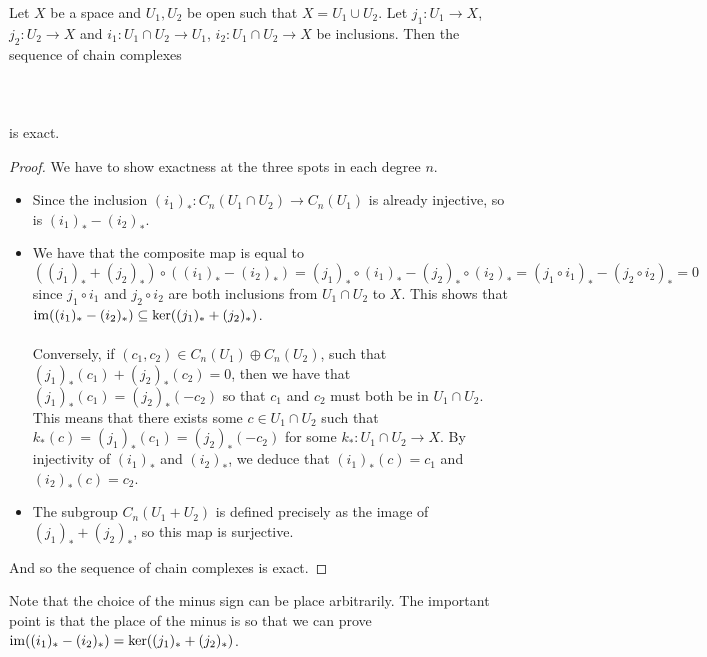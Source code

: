 \documentclass[a4paper]{article}
\begin{document}
\begin{prp}{}{} Let $X$ be a space and $U_1,U_2$ be open such that $X=U_1\cup U_2$. Let $j_1:U_1\to X$, $j_2:U_2\to X$ and $i_1:U_1\cap U_2\to U_1$, $i_2:U_1\cap U_2\to X$ be inclusions. Then the sequence of chain complexes \\~\\
\\~\\
is exact. \tcbline
\begin{proof}
We have to show exactness at the three spots in each degree $n$. 
\begin{itemize}
\item Since the inclusion $(i_1)_\ast:C_n(U_1\cap U_2)\to C_n(U_1)$ is already injective, so is $(i_1)_\ast-(i_2)_\ast$. 
\item We have that the composite map is equal to $$((j_1)_\ast+(j_2)_\ast)\circ((i_1)_\ast-(i_2)_\ast)=(j_1)_\ast\circ(i_1)_\ast-(j_2)_\ast\circ(i_2)_\ast=(j_1\circ i_1)_\ast-(j_2\circ i_2)_\ast=0$$ since $j_1\circ i_1$ and $j_2\circ i_2$ are both inclusions from $U_1\cap U_2$ to $X$. This shows that $\operatorname{im}((i_1)_\ast-(i_2)_\ast)\subseteq\ker((j_1)_\ast+(j_2)_\ast)$. \\~\\

Conversely, if $(c_1,c_2)\in C_n(U_1)\oplus C_n(U_2)$, such that $(j_1)_\ast(c_1)+(j_2)_\ast(c_2)=0$, then we have that $(j_1)_\ast(c_1)=(j_2)_\ast(-c_2)$ so that $c_1$ and $c_2$ must both be in $U_1\cap U_2$. This means that there exists some $c\in U_1\cap U_2$ such that $k_\ast(c)=(j_1)_\ast(c_1)=(j_2)_\ast(-c_2)$ for some $k_\ast:U_1\cap U_2\to X$. By injectivity of $(i_1)_\ast$ and $(i_2)_\ast$, we deduce that $(i_1)_\ast(c)=c_1$ and $(i_2)_\ast(c)=c_2$. 
\item The subgroup $C_n(U_1+U_2)$ is defined precisely as the image of $(j_1)_\ast+(j_2)_\ast$, so this map is surjective. 
\end{itemize}
And so the sequence of chain complexes is exact. 
\end{proof}
\end{prp}

Note that the choice of the minus sign can be place arbitrarily. The important point is that the place of the minus is so that we can prove $\operatorname{im}((i_1)_\ast-(i_2)_\ast)=\ker((j_1)_\ast+(j_2)_\ast)$. \\~\\
\end{document}
